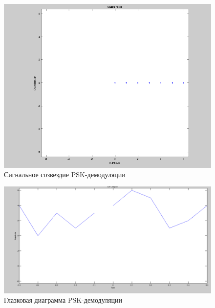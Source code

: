 \begin{figure}[H]
\includegraphics[width=150mm, scale = 0.9]{lab9/9_7}
   \caption{Сигнальное созвездие PSK-демодуляции}
\end{figure}



\begin{figure}[H]
\includegraphics[width=150mm, scale = 0.9]{lab9/9_8}
   \caption{Глазковая диаграмма PSK-демодуляции}
\end{figure}



